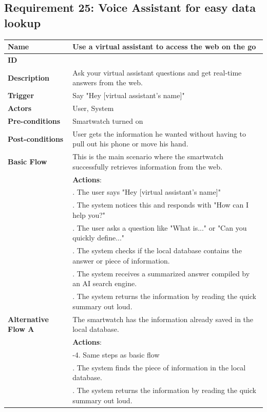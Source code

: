 \documentclass{article}
\begin{document}
	\subsection{Requirement 25: Voice Assistant for easy data lookup}
	\vspace{1em}
	\begin{center}
		\small
		\begin{tabularx}{1.0\textwidth}{|>{\raggedright\arraybackslash}p{}|>{\raggedright\arraybackslash}X|}
			\hline
			\textbf{Name}               & Use a virtual assistant to access the web on the go \\ \hline
			\textbf{ID}                 & 25 \\ \hline
			\textbf{Description}        & Ask your virtual assistant questions and get real-time answers from the web. \\ \hline
			\textbf{Trigger}            & Say "Hey [virtual assistant's name]" \\ \hline
			\textbf{Actors}             & User, System \\ \hline
			\textbf{Pre-conditions}     & Smartwatch turned on \\ \hline
			\textbf{Post-conditions}    & User gets the information he wanted without having to pull out his phone or move his hand. \\ \hline
			\textbf{Basic Flow}         & This is the main scenario where the smartwatch successfully retrieves information from the web. \\ \hline
										& \textbf{Actions}: \\ 
										& 1. The user says "Hey [virtual assistant's name]" \\ 
										& 2. The system notices this and responds with "How can I help you?" \\ 
										& 3. The user asks a question like "What is..." or "Can you quickly define..." \\ 
										& 4. The system checks if the local database contains the answer or piece of information. \\ 
										& 5. The system receives a summarized answer compiled by an AI search engine. \\ 
										& 6. The system returns the information by reading the quick summary out loud. \\ \hline
			\textbf{Alternative Flow A} & The smartwatch has the information already saved in the local database. \\ \hline
										& \textbf{Actions}: \\ 
										& 1-4. Same steps as basic flow \\ 
										& 5. The system finds the piece of information in the local database. \\ 
										& 6. The system returns the information by reading the quick summary out loud. \\ \hline
		\end{tabularx}
		\end{center}
\end{document}
